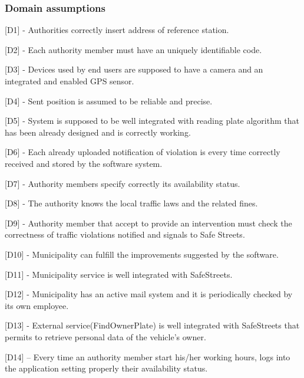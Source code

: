 \documentclass[12pt]{article}
\begin{document}
\subsubsection{Domain assumptions}
\begin{flushleft}

[D1] - Authorities correctly insert address of reference station.
\vspace{2mm}

[D2] - Each authority member must have an uniquely identifiable code.
\vspace{2mm}

[D3] - Devices used by end users are supposed to have a camera and an integrated and enabled GPS sensor.
\vspace{2mm}

[D4] - Sent position is assumed to be reliable and precise.
\vspace{2mm}

[D5] - System is supposed to be well integrated with reading plate algorithm that has been already designed and is correctly working.
\vspace{2mm}

[D6] - Each already uploaded notification of violation is every time correctly received and stored by the software system.
\vspace{2mm}

[D7] - Authority members specify correctly its availability status.
\vspace{2mm}

[D8] - The authority knows the local traffic laws and the related fines.
\vspace{2mm}

[D9] - Authority member that accept to provide an intervention must check the correctness of traffic violations notified and signals to Safe Streets.
\vspace{2mm}

[D10] - Municipality can fulfill the improvements suggested by the software.
\vspace{2mm}

[D11] - Municipality service is well integrated with SafeStreets.
\vspace{2mm}

[D12] - Municipality has an active mail system and it is periodically checked by its own employee.
\vspace{2mm}

[D13] - External service(FindOwnerPlate) is well integrated with SafeStreets that permits to retrieve personal data of the vehicle’s owner.
\vspace{2mm}

[D14] – Every time an authority member start his/her working hours, logs into the application setting properly their availability status.
\vspace{2mm}

\end{flushleft}
\end{document}
